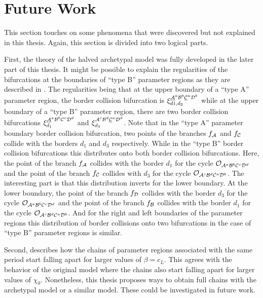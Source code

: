 \section{Future Work}
\label{sec:concl.future}

This section touches on some phenomena that were discovered but not explained in this thesis.
Again, this section is divided into two logical parts.

First, the theory of the halved archetypal model was fully developed in the later part of this thesis.
It might be possible to explain the regularities of the bifurcations at the boundaries of ``type B'' parameter regions as they are described in .
The regularities being that at the upper boundary of a ``type A'' parameter region, the border collision bifurcation is $\xi_{d1, d_2}^{\underline{\mathcal{A}}^a\mathcal{B}^b\underline{\mathcal{C}}^a\mathcal{D}^b}$ while at the upper boundary of a ``type B'' parameter region, there are two border collision bifurcations $\xi_{d_1}^{\underline{\mathcal{A}}^a\mathcal{B}^b\mathcal{C}^c\mathcal{D}^d}$ and $\xi_{d_3}^{\mathcal{A}^c\mathcal{B}^d\underline{\mathcal{C}}^a\mathcal{D}^d}$.
Note that in the ``type A'' parameter boundary border collision bifurcation, two points of the branches $f_{\mathcal{A}}$ and $f_{\mathcal{C}}$ collide with the borders $d_1$ and $d_3$ respectively.
While in the ``type B'' border collision bifurcations this distributes onto both border collision bifurcations.
Here, the point of the branch $f_{\mathcal{A}}$ collides with the border $d_1$ for the cycle $\mathcal{O}_{\mathcal{A}^a\mathcal{B}^b\mathcal{C}^c\mathcal{D}^d}$ and the point of the branch $f_{\mathcal{C}}$ collides with $d_3$ for the cycle $\mathcal{O}_{\mathcal{A}^c\mathcal{B}^d\mathcal{C}^a\mathcal{D}^b}$.
The interesting part is that this distribution inverts for the lower boundary.
At the lower boundary, the point of the branch $f_{\mathcal{D}}$ collides with the border $d_3$ for the cycle $\mathcal{O}_{\mathcal{A}^a\mathcal{B}^b\mathcal{C}^c\mathcal{D}^d}$ and the point of the branch $f_{\mathcal{B}}$ collides with the border $d_1$ for the cycle $\mathcal{O}_{\mathcal{A}^c\mathcal{B}^d\mathcal{C}^a\mathcal{D}^b}$.
And for the right and left boundaries of the parameter regions this distribution of border collisions onto two bifurcations in the case of ``type B'' parameter regions is similar.

Second,  describes how the chains of parameter regions associated with the same period start falling apart for larger values of $\beta = c_L$.
This agrees with the behavior of the original model where the chains also start falling apart for larger values of $\chi_0$.
Nonetheless, this thesis proposes ways to obtain full chains with the archetypal model or a similar model.
These could be investigated in future work.

